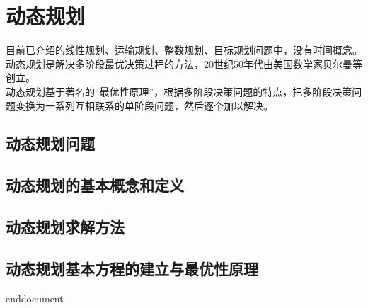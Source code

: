 \ifx\allfiles\undefined

	
	
\else
\fi
    \chapter{动态规划}
    目前已介绍的线性规划、运输规划、整数规划、目标规划问题中，没有时间概念。\\
    动态规划是解决多阶段最优决策过程的方法，20世纪50年代由美国数学家贝尔曼等创立。\\
    动态规划基于著名的“最优性原理”，根据多阶段决策问题的特点，把多阶段决策问题变换为一系列互相联系的单阶段问题，然后逐个加以解决。\\
    \section{动态规划问题}
    \section{动态规划的基本概念和定义}
    \section{动态规划求解方法}
    \section{动态规划基本方程的建立与最优性原理}

\ifx\allfiles\undefined
	
	
	end{document}
	\else
	\fi